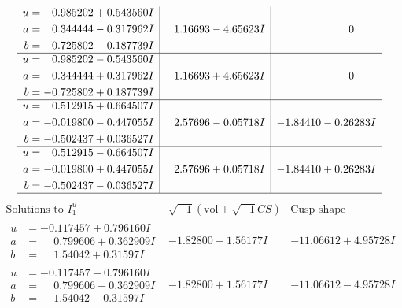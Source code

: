 \documentclass[1p]{elsarticle_modified}
\theoremstyle{definition}
\newcommand{\I}{\sqrt{-1}}
\begin{document}
$$\begin{array}{c|c|c}
\begin{aligned}
u &= \phantom{-}0.985202 + 0.543560 I \\
a &= \phantom{-}0.344444 - 0.317962 I \\
b &= -0.725802 - 0.187739 I\end{aligned}
 & \phantom{-}1.16693 - 4.65623 I & \phantom{-0.000000 } 0 \\ \hline\begin{aligned}
u &= \phantom{-}0.985202 - 0.543560 I \\
a &= \phantom{-}0.344444 + 0.317962 I \\
b &= -0.725802 + 0.187739 I\end{aligned}
 & \phantom{-}1.16693 + 4.65623 I & \phantom{-0.000000 } 0 \\ \hline\begin{aligned}
u &= \phantom{-}0.512915 + 0.664507 I \\
a &= -0.019800 - 0.447055 I \\
b &= -0.502437 + 0.036527 I\end{aligned}
 & \phantom{-}2.57696 - 0.05718 I & -1.84410 - 0.26283 I \\ \hline\begin{aligned}
u &= \phantom{-}0.512915 - 0.664507 I \\
a &= -0.019800 + 0.447055 I \\
b &= -0.502437 - 0.036527 I\end{aligned}
 & \phantom{-}2.57696 + 0.05718 I & -1.84410 + 0.26283 I\\
 \hline 
 \end{array}$$\newpage$$\begin{array}{c|c|c}  
\text{Solutions to }I^u_{1}& \I (\text{vol} + \sqrt{-1}CS) & \text{Cusp shape}\\
 \hline 
\begin{aligned}
u &= -0.117457 + 0.796160 I \\
a &= \phantom{-}0.799606 + 0.362909 I \\
b &= \phantom{-}1.54042 + 0.31597 I\end{aligned}
 & -1.82800 - 1.56177 I & -11.06612 + 4.95728 I \\ \hline\begin{aligned}
u &= -0.117457 - 0.796160 I \\
a &= \phantom{-}0.799606 - 0.362909 I \\
b &= \phantom{-}1.54042 - 0.31597 I\end{aligned}
 & -1.82800 + 1.56177 I & -11.06612 - 4.95728 I \\ \hline\begin{aligned}

\end{aligned}
\end{array}$$
\end{document}
